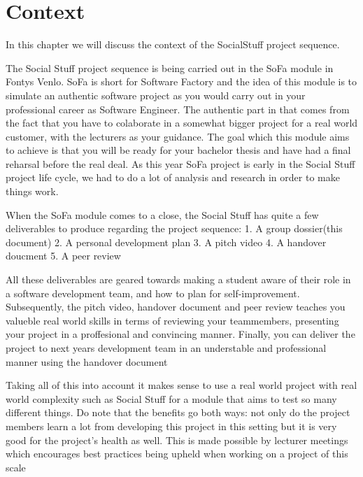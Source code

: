 \chapter{Context}\label{ch:context}
In this chapter we will discuss the context of the SocialStuff project sequence.

The Social Stuff project sequence is being carried out in the SoFa module in Fontys Venlo. SoFa is short for Software Factory and the idea of this module is to simulate an authentic software project as you would carry out in your professional career as Software Engineer. The authentic part in that comes from the fact that you have to colaborate in a somewhat bigger project for a real world customer, with the lecturers as your guidance. The goal which this module aims to achieve is that you will be ready for your bachelor thesis and have had a final reharsal before the real deal. As this year SoFa project is early in the Social Stuff project life cycle, we had to do a lot of analysis and research in order to make things work.

When the SoFa module comes to a close, the Social Stuff has quite a few deliverables to produce regarding the project sequence:
1. A group dossier(this document)
2. A personal development plan
3. A pitch video
4. A handover doucment
5. A peer review

All these deliverables are geared towards making a student aware of their role in a software development team, and how to plan for self-improvement.
Subsequently, the pitch video, handover document and peer review teaches you valueble real world skills in terms of reviewing your teammembers, presenting your project in a proffesional and convincing manner.
Finally, you can deliver the project to next years development team in an understable and professional manner using the handover document

Taking all of this into account it makes sense to use a real world project with real world complexity such as Social Stuff for a module that aims to test so many different things.
Do note that the benefits go both ways: not only do the project members learn a lot from developing this project in this setting but it is very good for the project's health as well. This is made possible by lecturer meetings which encourages best practices being upheld when working on a project of this scale

